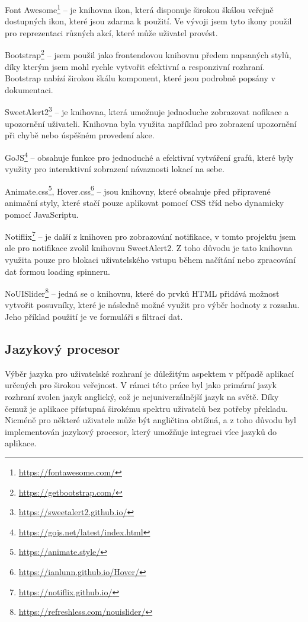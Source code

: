\begin{description}
    \item Font Awesome\footnote{\href{https://fontawesome.com/}{https://fontawesome.com/}} -- je knihovna ikon, která disponuje širokou škálou veřejně dostupných ikon, které jsou zdarma k použití. Ve vývoji jsem tyto ikony použil pro reprezentaci různých akcí, které může uživatel provést.
    \item Bootstrap\footnote{\href{https://getbootstrap.com/}{https://getbootstrap.com/}} -- jsem použil jako frontendovou knihovnu předem napsaných stylů, díky kterým jsem mohl rychle vytvořit efektivní a responzivní rozhraní. Bootstrap nabízí širokou škálu komponent, které jsou podrobně popsány v dokumentaci.
    \item SweetAlert2\footnote{\href{https://sweetalert2.github.io/}{https://sweetalert2.github.io/}} -- je knihovna, která umožnuje jednoduche zobrazovat nofikace a upozornění uživateli. Knihovna byla využita například pro zobrazení upozornění při chybě nebo úspěšném provedení akce.
    \item GoJS\footnote{\href{https://gojs.net/latest/index.html}{https://gojs.net/latest/index.html}} -- obsahuje funkce pro jednoduché a efektivní vytváření grafů, které byly využity pro interaktivní zobrazení návaznosti lokací na sebe.
    \item Animate.css\footnote{\href{https://animate.style/}{https://animate.style/}}, Hover.css\footnote{\href{https://ianlunn.github.io/Hover/}{https://ianlunn.github.io/Hover/}} -- jsou knihovny, které obsahuje před připravené animační styly, které stačí pouze aplikovat pomocí CSS tříd nebo dynamicky pomocí JavaScriptu.
    \item Notiflix\footnote{\href{https://notiflix.github.io/}{https://notiflix.github.io/}} -- je další z knihoven pro zobrazování notifikace, v tomto projektu jsem ale pro notifikace zvolil knihovnu SweetAlert2. Z toho důvodu je tato knihovna využita pouze pro blokaci uživatelského vstupu během načítání nebo zpracování dat formou loading spinneru.
    \item NoUISlider\footnote{\href{https://refreshless.com/nouislider/}{https://refreshless.com/nouislider/}} -- jedná se o knihovnu, které do prvků HTML přidává možnost vytvořit posuvníky, které je následně možné využit pro výběr hodnoty z rozsahu. Jeho příklad použití je ve formuláři s filtrací dat.
\end{description}

\subsection{Jazykový procesor}
\label{subsec:implementation-technologies-compiler}
Výběr jazyka pro uživatelské rozhraní je důležitým aspektem v případě aplikací určených pro širokou veřejnost. V rámci této práce byl jako primární jazyk rozhraní zvolen jazyk anglický, což je nejuniverzálnější jazyk na světě. Díky čemuž je aplikace přístupná širokému spektru uživatelů bez potřeby překladu. Nicméně pro některé uživatele může být angličtina obtížná, a z toho důvodu byl implementován jazykový procesor, který umožňuje integraci více jazyků do aplikace.

